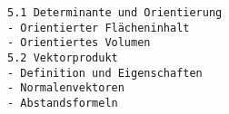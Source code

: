 \begin{verbatim}
5.1 Determinante und Orientierung
- Orientierter Flächeninhalt
- Orientiertes Volumen
5.2 Vektorprodukt
- Definition und Eigenschaften
- Normalenvektoren
- Abstandsformeln
\end{verbatim}

